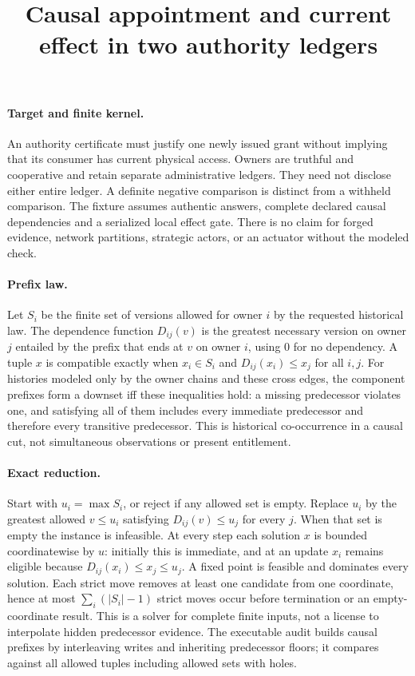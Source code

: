 \documentclass{article}
\title{Causal appointment and current effect in two authority ledgers}
\begin{document}
\maketitle
\paragraph{Target and finite kernel.}
An authority certificate must justify one newly issued grant without implying that its consumer has current physical access. Owners are truthful and cooperative and retain separate administrative ledgers. They need not disclose either entire ledger. A definite negative comparison is distinct from a withheld comparison. The fixture assumes authentic answers, complete declared causal dependencies and a serialized local effect gate. There is no claim for forged evidence, network partitions, strategic actors, or an actuator without the modeled check.

\paragraph{Prefix law.}
Let \(S_i\) be the finite set of versions allowed for owner \(i\) by the requested historical law. The dependence function \(D_{ij}(v)\) is the greatest necessary version on owner \(j\) entailed by the prefix that ends at \(v\) on owner \(i\), using 0 for no dependency. A tuple \(x\) is compatible exactly when \(x_i\in S_i\) and \(D_{ij}(x_i)\le x_j\) for all \(i,j\). For histories modeled only by the owner chains and these cross edges, the component prefixes form a downset iff these inequalities hold: a missing predecessor violates one, and satisfying all of them includes every immediate predecessor and therefore every transitive predecessor. This is historical co-occurrence in a causal cut, not simultaneous observations or present entitlement.

\paragraph{Exact reduction.}
Start with \(u_i=\max S_i\), or reject if any allowed set is empty. Replace \(u_i\) by the greatest allowed \(v\le u_i\) satisfying \(D_{ij}(v)\le u_j\) for every \(j\). When that set is empty the instance is infeasible. At every step each solution \(x\) is bounded coordinatewise by \(u\): initially this is immediate, and at an update \(x_i\) remains eligible because \(D_{ij}(x_i)\le x_j\le u_j\). A fixed point is feasible and dominates every solution. Each strict move removes at least one candidate from one coordinate, hence at most \(\sum_i(|S_i|-1)\) strict moves occur before termination or an empty-coordinate result. This is a solver for complete finite inputs, not a license to interpolate hidden predecessor evidence. The executable audit builds causal prefixes by interleaving writes and inheriting predecessor floors; it compares against all allowed tuples including allowed sets with holes.
\end{document}
